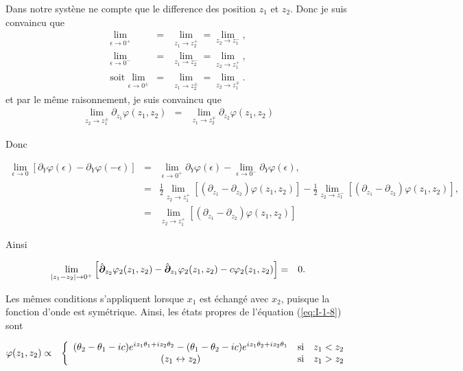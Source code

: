 {\color{gray} 
Dans notre systène ne compte que le difference des position $z_1$ et $z_2$. Donc je suis convaincu que  
\begin{eqnarray*}
	\underset{ \epsilon \to 0^+ }{\lim}	&=& \underset{ z_1 \to z_2^+ }{\lim} = \underset{ z_2 \to z_1^- }{\lim},\\
	\underset{ \epsilon \to 0^- }{\lim}	&=& \underset{ z_1 \to z_2^- }{\lim} = \underset{ z_2 \to z_1^+ }{\lim},  \\
	\mbox{soit   } \underset{ \epsilon \to 0^\pm  }{\lim}	&=& \underset{ z_1 \to z_2^\pm  }{\lim} = \underset{ z_2 \to z_1^\mp  }{\lim}.
\end{eqnarray*}
et par le même raisonnement, je suis convaincu que
\begin{eqnarray*}
	\underset{ z_2 \to z_1^\pm  }{\lim}	\partial_{z_1} \varphi (z_1, z_2) & = & \underset{ z_1 \to z_2^\mp  }{\lim}	\partial_{z_2} \varphi (z_1, z_2)
\end{eqnarray*}

Donc 

\begin{eqnarray*}
	\underset{ \epsilon \to 0 }{\lim}  \left [ \partial_Y \varphi(\epsilon) - \partial_Y \varphi(-\epsilon) \right ] & = & 	\underset{ \epsilon \to 0^+ }{\lim}   \partial_Y \varphi(\epsilon) 	 - \underset{ \epsilon \to 0^- }{\lim}  \partial_Y \varphi(\epsilon),\\
	& = &  \frac{1}2 \underset{ z_2 \to z_1^+ }{\lim} \left [ \left ( \partial_{z_1} -\partial_{z_2} \right )\varphi ( z_1 , z_2 ) \right ] -  \frac{1}2 \underset{ z_2 \to z_1^- }{\lim} \left [ \left ( \partial_{z_1} -\partial_{z_2} \right )\varphi ( z_1 , z_2 ) \right ],\\
	& = & \underset{ z_2 \to z_1^+ }{\lim} \left [ \left ( \partial_{z_1} -\partial_{z_2} \right )\varphi ( z_1 , z_2 ) \right ]
\end{eqnarray*}

Ainsi 
}
\begin{eqnarray}
	\underset{ \vert z_1 - z_2 \vert  \to 0^+ }{\lim}  \left [  \hat{\bm{\partial}}_{z_2}  \varphi _2( z_1 , z_2 ) - \hat{\bm{\partial}}_{z_1}  \varphi_2 ( z_1 , z_2 ) - c  \varphi_2 ( z_1 , z_2 ) \right ] & = &0.  		
\end{eqnarray}

Les mêmes conditions s'appliquent lorsque $x_1$ est échangé avec $x_2$, puisque la fonction d'onde est symétrique. Ainsi, les états propres de l'équation (\ref{eq:I-1-8}) sont

\begin{eqnarray}\label{eq:I-1-10}
	\varphi(z_1 , z_2) & \propto &  \left \{ \begin{array} { c cl} ( \theta_2 - \theta_1 - ic) e^{ i z_1 \theta_1 + iz_2 \theta_2 } - ( \theta_1 - \theta_2 - ic) e^{ i z_1 \theta_2 + iz_2 \theta_1} & \mbox{si} & z_1 < z_2 \\ (z_1 \leftrightarrow z_2) & \mbox{si} & z_1 > z_2 \end{array} \right.
\end{eqnarray}

